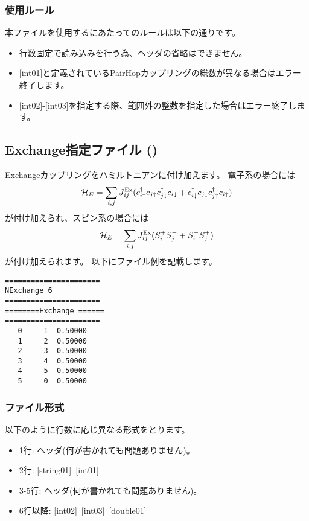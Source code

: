 \subsubsection{使用ルール}
本ファイルを使用するにあたってのルールは以下の通りです。
\begin{itemize}
\item 行数固定で読み込みを行う為、ヘッダの省略はできません。
\item $[$int01$]$と定義されているPairHopカップリングの総数が異なる場合はエラー終了します。
\item $[$int02$]$-$[$int03$]$を指定する際、範囲外の整数を指定した場合はエラー終了します。
\end{itemize}

\newpage
\subsection{Exchange指定ファイル ()}
Exchangeカップリングをハミルトニアンに付け加えます。
電子系の場合には
\begin{equation}
{\cal H}_E  =\sum_{i,j}J_{ij}^{\rm Ex} (c_ {i \uparrow}^{\dag}c_{j\uparrow}c_{j \downarrow}^{\dag}c_{i  \downarrow}+c_ {i \downarrow}^{\dag}c_{j\downarrow}c_{j \uparrow}^{\dag}c_{i  \uparrow})
\end{equation}
が付け加えられ、スピン系の場合には
\begin{equation}
{\cal H}_E =\sum_{i,j}J_{ij}^{\rm Ex} (S_i^+S_j^-+S_i^-S_j^+)
\end{equation}
が付け加えられます。
以下にファイル例を記載します。

\begin{minipage}{12.5cm}
\begin{screen}
\begin{verbatim}
====================== 
NExchange 6  
====================== 
========Exchange ====== 
====================== 
   0     1  0.50000
   1     2  0.50000
   2     3  0.50000
   3     4  0.50000
   4     5  0.50000
   5     0  0.50000
\end{verbatim}
\end{screen}
\end{minipage}

\subsubsection{ファイル形式}
以下のように行数に応じ異なる形式をとります。
 \begin{itemize}
   \item  1行:  ヘッダ(何が書かれても問題ありません)。
   \item  2行:   [string01]~[int01]
   \item  3-5行:  ヘッダ(何が書かれても問題ありません)。
   \item  6行以降:
   [int02]~[int03]~[double01] 
  \end{itemize}
